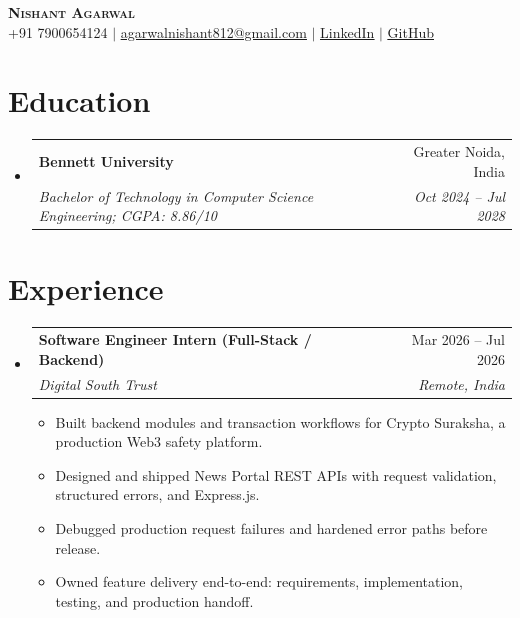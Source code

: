 \documentclass[letterpaper,11pt]{article}
\makeatletter
\newcommand{\resumeItem}[1]{
  \item\small{
    {#1 \vspace{-5pt}}
  }
}
\newcommand{\resumeSubheading}[4]{
  \vspace{-2pt}\item
    \begin{tabular*}{0.97\textwidth}[t]{l@{\extracolsep{\fill}}r}
      \textbf{#1} & #2 \\
      \textit{\small#3} & \textit{\small #4} \\
    \end{tabular*}\vspace{-9pt}
}
\newcommand{\resumeSubHeadingListStart}{\begin{itemize}[leftmargin=0.15in, label={}]}
\newcommand{\resumeSubHeadingListEnd}{\end{itemize}}
\newcommand{\resumeItemListStart}{\begin{itemize}}
\newcommand{\resumeItemListEnd}{\end{itemize}\vspace{-10pt}}
\makeatother
\begin{document}
\begin{center}
  \textbf{\Huge \scshape Nishant Agarwal} \\ \vspace{1pt}
  \small +91 7900654124 $|$
  \href{mailto:agarwalnishant812@gmail.com}{\underline{agarwalnishant812@gmail.com}} $|$
  \href{https://www.linkedin.com/in/nishant-agarwal-62a956322/}{\underline{LinkedIn}} $|$
  \href{https://github.com/nishant-uxs}{\underline{GitHub}}
\end{center}

\section{Education}
  \resumeSubHeadingListStart
    \resumeSubheading
      {Bennett University}{Greater Noida, India}
      {Bachelor of Technology in Computer Science Engineering; CGPA: 8.86/10}{Oct 2024 -- Jul 2028}
  \resumeSubHeadingListEnd

\section{Experience}
  \resumeSubHeadingListStart
    \resumeSubheading
      {Software Engineer Intern (Full-Stack / Backend)}{Mar 2026 -- Jul 2026}
      {Digital South Trust}{Remote, India}
      \resumeItemListStart
        \resumeItem{Built backend modules and transaction workflows for Crypto Suraksha, a production Web3 safety platform.}
        \resumeItem{Designed and shipped News Portal REST APIs with request validation, structured errors, and Express.js.}
        \resumeItem{Debugged production request failures and hardened error paths before release.}
        \resumeItem{Owned feature delivery end-to-end: requirements, implementation, testing, and production handoff.}
      \resumeItemListEnd
  \resumeSubHeadingListEnd
\end{document}
